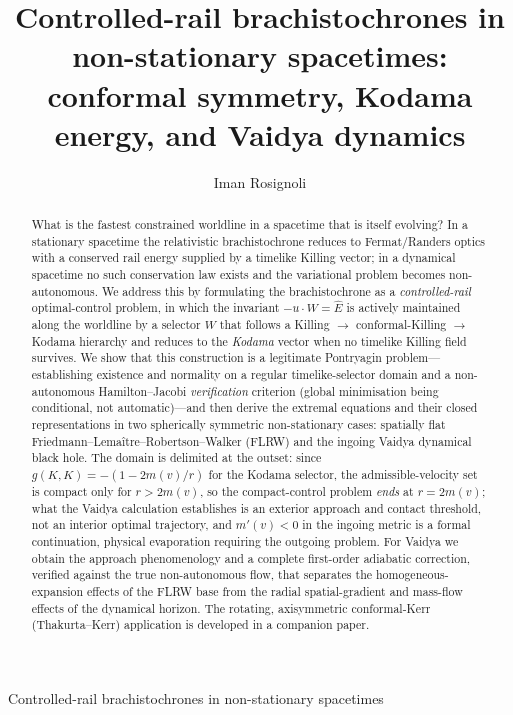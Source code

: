 \documentclass[12pt]{iopart}
\newcommand{\Ehat}{\hat E}
\begin{document}
\title{Controlled-rail brachistochrones in non-stationary spacetimes:
conformal symmetry, Kodama energy, and Vaidya dynamics}

\author{Iman Rosignoli}
\address{Department of Physics, University of Pavia, Via A.\ Bassi 6, 27100 Pavia, Italy}

\begin{abstract}
What is the fastest constrained worldline in a spacetime that is itself evolving? In a
stationary spacetime the relativistic brachistochrone reduces to Fermat/Randers optics
with a conserved rail energy supplied by a timelike Killing vector; in a dynamical
spacetime no such conservation law exists and the variational problem becomes
non-autonomous. We address this by formulating the brachistochrone as a
\emph{controlled-rail} optimal-control problem, in which the invariant $-u\cdot W=\Ehat$ is
actively maintained along the worldline by a selector $W$ that follows a Killing $\to$
conformal-Killing $\to$ Kodama hierarchy and reduces to the \emph{Kodama} vector when no
timelike Killing field survives. We show that this construction is a legitimate
Pontryagin problem---establishing existence and normality on a regular timelike-selector
domain and a non-autonomous Hamilton--Jacobi \emph{verification} criterion (global
minimisation being conditional, not automatic)---and then derive the extremal equations
and their closed representations in two spherically symmetric non-stationary cases:
spatially flat Friedmann--Lema\^itre--Robertson--Walker (FLRW) and the ingoing Vaidya
dynamical black hole. The domain is delimited at the outset: since
$g(K,K)=-(1-2m(v)/r)$ for the Kodama selector, the admissible-velocity set is compact
only for $r>2m(v)$, so the compact-control problem \emph{ends} at $r=2m(v)$; what the
Vaidya calculation establishes is an exterior approach and contact threshold, not an
interior optimal trajectory, and $m'(v)<0$ in the ingoing metric is a formal
continuation, physical evaporation requiring the outgoing problem. For Vaidya we obtain
the approach phenomenology and a complete
first-order adiabatic correction, verified against the true non-autonomous flow, that
separates the homogeneous-expansion effects of the FLRW base from the radial
spatial-gradient and mass-flow effects of the dynamical horizon. The rotating,
axisymmetric conformal-Kerr (Thakurta--Kerr)
application is developed in a companion paper.
\end{abstract}

\maketitle
%
         {Controlled-rail brachistochrones in non-stationary spacetimes}
\end{document}
